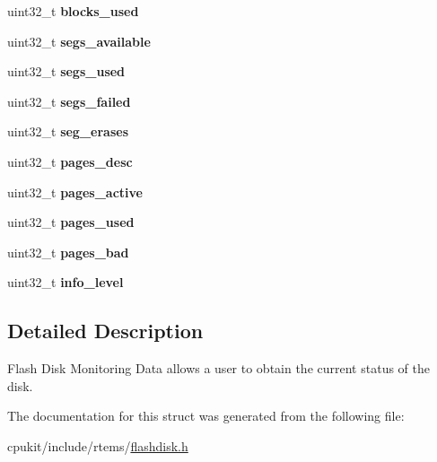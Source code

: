 \begin{DoxyCompactItemize}
uint32\+\_\+t {\bfseries blocks\+\_\+used}
\item 
\mbox{\label{structrtems__fdisk__monitor__data_a0879b36ea03774eab2d09c20f3d3bc90}} 
uint32\+\_\+t {\bfseries segs\+\_\+available}
\item 
\mbox{\label{structrtems__fdisk__monitor__data_a2d45ce087dc783852db38406911b869b}} 
uint32\+\_\+t {\bfseries segs\+\_\+used}
\item 
\mbox{\label{structrtems__fdisk__monitor__data_a723f5fbb9ef6ffc1c8d5420eac0109a2}} 
uint32\+\_\+t {\bfseries segs\+\_\+failed}
\item 
\mbox{\label{structrtems__fdisk__monitor__data_a0b9dbb120b56d0334ad06fc8d599bb74}} 
uint32\+\_\+t {\bfseries seg\+\_\+erases}
\item 
\mbox{\label{structrtems__fdisk__monitor__data_a0427dde868ae27c9ee1223229852c75a}} 
uint32\+\_\+t {\bfseries pages\+\_\+desc}
\item 
\mbox{\label{structrtems__fdisk__monitor__data_ae32ed67f9096ec2774a7c579bf292c52}} 
uint32\+\_\+t {\bfseries pages\+\_\+active}
\item 
\mbox{\label{structrtems__fdisk__monitor__data_a4e6a5adb7b07a5e931cfc5c3873ffb94}} 
uint32\+\_\+t {\bfseries pages\+\_\+used}
\item 
\mbox{\label{structrtems__fdisk__monitor__data_a1fbfbddc0c8049366abf4e542e5379b6}} 
uint32\+\_\+t {\bfseries pages\+\_\+bad}
\item 
\mbox{\label{structrtems__fdisk__monitor__data_a39d4f4ed69e1a47215c0e1327ab4591a}} 
uint32\+\_\+t {\bfseries info\+\_\+level}
\end{DoxyCompactItemize}


\subsection{Detailed Description}
Flash Disk Monitoring Data allows a user to obtain the current status of the disk. 

The documentation for this struct was generated from the following file\+:\begin{DoxyCompactItemize}
\item 
cpukit/include/rtems/\mbox{\hyperlink{flashdisk_8h}{flashdisk.\+h}}\end{DoxyCompactItemize}
